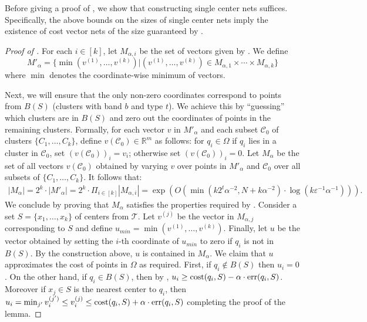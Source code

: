 \documentclass[11pt]{article}
\theoremstyle{restate}
\theoremstyle{definition}
\newcommand{\eps}{\ensuremath{\varepsilon}}
\newcommand{\R}{\ensuremath{\mathbb{R}}}
\newcommand{\cost}{\textnormal{cost}}
\newcommand{\err}{\textnormal{err}}
\begin{document}
\noindent Before giving a proof of , we show that constructing single center nets suffices. Specifically, the above bounds on the sizes of single center nets imply the existence of cost vector nets of the size guaranteed by .
\begin{proof}[Proof of  ]
	
	For each $i \in [k]$, let $M_{\alpha,i}$ be the set of vectors given by . We define $$M'_{\alpha} = \{\min(v^{(1)}, \ldots, v^{(k)}) | (v^{(1)}, \ldots, v^{(k)}) \in M_{\alpha,1} \times \cdots \times M_{\alpha,k}\}$$
where $\min$ denotes the coordinate-wise minimum of vectors.

Next, we will ensure that the only non-zero coordinates correspond to points from $B(S)$ (clusters with band $b$ and type $t$). We achieve this  by ``guessing'' which clusters are in $B(S)$ and zero out the coordinates of points in the remaining clusters. Formally, for each vector $v$ in $M'_\alpha$ and each subset $\mathcal{C}_0$ of clusters $\{C_1, \ldots, C_k\}$, define $v(\mathcal{C}_0) \in \R^m$ as follows: for $q_i \in \Omega$ if $q_i$ lies in a cluster in $\mathcal{C}_0$, set $(v(\mathcal{C}_0))_i = v_i$; otherwise set $(v(\mathcal{C}_0))_i = 0$. Let $M_{\alpha}$ be the set of all vectors $v(\mathcal{C}_0)$ obtained by varying $v$ over points in $M'_\alpha$ and $\mathcal{C}_0$ over all subsets of $\{C_1, \ldots, C_k\}$. It follows that:
\begin{align*}
    |M_{\alpha}| = 2^k \cdot |M'_\alpha| = 2^k \cdot  \Pi_{i \in [k]} |M_{\alpha,i}| = \exp(O(\min(k2^t \alpha^{-2}, N + k \alpha^{-2}) \cdot \log(k \eps^{-1} \alpha^{-1}))).
\end{align*}
We conclude by proving that $M_{\alpha}$ satisfies the properties required by . Consider a set $S =\{x_1, \ldots, x_k\}$ of centers from $\mathcal{T}$.  Let $v^{(j)}$ be the vector in $M_{\alpha,j}$ corresponding to $S$ and define $u_{min} =\min(v^{(1)}, \ldots, v^{(k)})$. Finally, let $u$ be the vector obtained by setting the $i$-th coordinate of $u_{min}$ to zero if $q_i$ is not in $B(S)$. By the construction above, $u$ is contained in $M_{\alpha}$.  We claim that $u$ approximates the cost of points in $\Omega$ as required. First, if $q_i \notin B(S)$ then $u_i = 0$. On the other hand, if $q_i \in B(S)$, then by , $u_i \geq  \cost(q_i,S) - \alpha \cdot \err(q_i,S)$. Moreover if $x_j \in S$ is the nearest center to $q_i$, then $u_i = \min_{j'} v^{(j')}_i \leq v^{(j)}_i \leq \cost(q_i,S)+\alpha \cdot \err(q_i,S)$ completing the proof of the lemma.
\end{proof}
\end{document}

